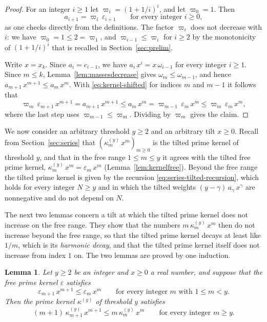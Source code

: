 \documentclass{amsart}
\newtheorem{lemma}[theorem]{Lemma}
\theoremstyle{definition}
\theoremstyle{remark}
\numberwithin{equation}{section}
\begin{document}
\begin{proof}
For an integer $i\ge1$ let $\varpi_i=(1+1/i)^i$, and let $\varpi_0=1$. Then
\begin{equation}\label{eq:kernel-shifted}
a_{i+1}=\varpi_i\,\varepsilon_{i+1}\qquad\text{for every integer }i\ge0 ,
\end{equation}
as one checks directly from the definitions. The factor $\varpi_i$ does not
decrease with $i$: we have $\varpi_0=1\le2=\varpi_1$, and
$\varpi_{i-1}\le\varpi_i$ for $i\ge2$ by the monotonicity of $(1+1/i)^i$
that is recalled in Section~\ref{sec:prelim}.

Write $x=x_k$. Since $a_i=c_{i-1}$, we have $a_i\,x^i=x\,\omega_{i-1}$ for
every integer $i\ge1$. Since $m\le k$, Lemma~\ref{lem:massesdecrease} gives
$\omega_m\le\omega_{m-1}$, and hence $a_{m+1}\,x^{m+1}\le a_m\,x^m$. With
\eqref{eq:kernel-shifted} for indices $m$ and $m-1$ it follows that
\[
\varpi_m\,\varepsilon_{m+1}\,x^{m+1}=a_{m+1}\,x^{m+1}\le a_m\,x^m
=\varpi_{m-1}\,\varepsilon_m\,x^m\le\varpi_m\,\varepsilon_m\,x^m ,
\]
where the last step uses $\varpi_{m-1}\le\varpi_m$. Dividing by $\varpi_m$
gives the claim.
\end{proof}

We now consider an arbitrary threshold $y\ge2$ and an arbitrary tilt
$x\ge0$. Recall from Section~\ref{sec:series} that
$(\kappa^{(y)}_m\,x^m)_{m\ge0}$ is the tilted prime kernel of threshold
$y$, and that in the free range $1\le m\le y$ it agrees with the tilted free
prime kernel, $\kappa^{(y)}_m\,x^m=\varepsilon_m\,x^m$
(Lemma~\ref{lem:kernelfree}). Beyond the free range the tilted prime kernel
is given by the recursion \eqref{eq:series-tilted-recursion}, which holds
for every integer $N\ge y$ and in which the tilted weights
$(y-\gamma)\,a_\gamma\,x^{\gamma}$ are nonnegative and do not depend
on $N$.

The next two lemmas concern a tilt at which the tilted prime kernel does
not increase on the free range. They show that the numbers
$m\,\kappa^{(y)}_m\,x^m$ then do not increase beyond the free range, so
that the tilted prime kernel decays at least like $1/m$, which is its
\emph{harmonic decay}, and that the tilted prime kernel itself does not
increase from index $1$ on. The two lemmas are proved by one induction.

\begin{lemma}\label{lem:harmonic}
Let $y\ge2$ be an integer and $x\ge0$ a real number, and suppose that the
free prime kernel $\varepsilon$ satisfies
\[
\varepsilon_{m+1}\,x^{m+1}\le\varepsilon_m\,x^m
\qquad\text{for every integer $m$ with }1\le m<y .
\]
Then the prime kernel $\kappa^{(y)}$ of threshold $y$ satisfies
\[
(m+1)\,\kappa^{(y)}_{m+1}\,x^{m+1}\le m\,\kappa^{(y)}_m\,x^m
\qquad\text{for every integer }m\ge y .
\]
\end{lemma}
\end{document}
